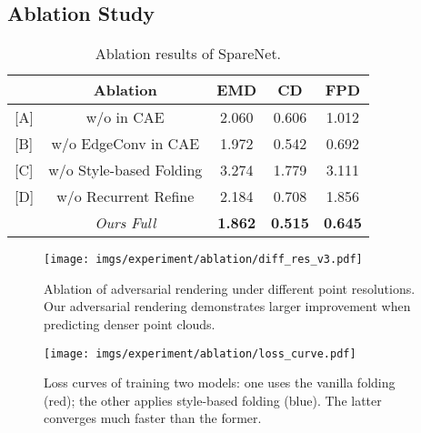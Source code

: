 \documentclass[final]{cvpr}
\begin{document}
\subsection{Ablation Study}


\begin{table}[t]
\begin{center}
\footnotesize
\setlength\tabcolsep{3.0pt}
\begin{tabular}{@{}lc|ccc@{}}
\toprule
& Ablation &  EMD & CD & FPD\\
\midrule
{[A]} & w/o  in CAE  &  2.060 & 0.606 &1.012\\
{[B]} & w/o EdgeConv in CAE &  1.972 & 0.542 &0.692\\
{[C]} & w/o Style-based Folding &  3.274 & 1.779 & 3.111\\
{[D]} & w/o Recurrent Refine &  2.184 & 0.708 &1.856\\
& \emph{Ours Full} & \textbf{1.862} & \textbf{0.515} & \textbf{0.645}\\
\bottomrule
\end{tabular}
\end{center}
\caption{Ablation results of SpareNet.}
\label{table:ablation}
\vspace{-1em}
\end{table}

\begin{figure}[t]
\centering
 \texttt{[image: imgs/experiment/ablation/diff\_res\_v3.pdf]}
 \footnotesize
\caption{Ablation of adversarial rendering under different point resolutions. Our adversarial rendering demonstrates larger improvement when predicting denser point clouds.}
\label{fig:differnet_resolution_ablation_emd}
\vspace{-1em}
\end{figure}

\begin{figure}[t]
\centering
 \texttt{[image: imgs/experiment/ablation/loss\_curve.pdf]}
 \footnotesize
\caption{Loss curves of training two models: one uses the vanilla folding (red); the other applies style-based folding (blue). The latter converges much faster than the former.}
\label{fig:adain_ablation}
\vspace{-1em}
\end{figure}
\end{document}
